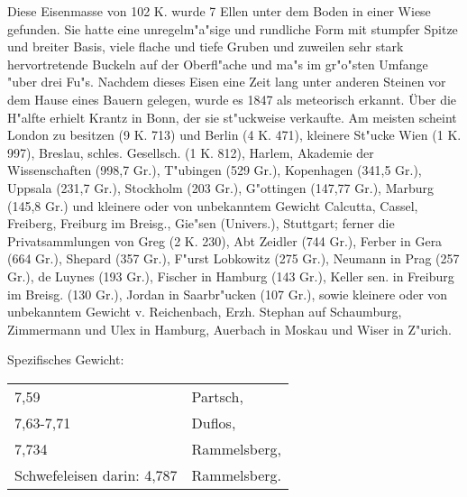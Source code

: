 \documentclass[a4paper, 11pt, oneside]{article}
\begin{document}
Diese Eisenmasse von 102 K. wurde 7 Ellen unter dem Boden in einer Wiese gefunden. Sie hatte eine unregelm"a"sige und rundliche Form mit stumpfer Spitze und breiter Basis, viele flache und tiefe Gruben und zuweilen sehr stark hervortretende Buckeln auf der Oberfl"ache und ma"s im gr"o"sten Umfange "uber drei Fu"s. Nachdem dieses Eisen eine Zeit lang unter anderen Steinen vor dem Hause eines Bauern gelegen, wurde es 1847 als meteorisch erkannt. Über die H"alfte erhielt Krantz in Bonn, der sie st"uckweise verkaufte. Am meisten scheint London zu besitzen (9 K. 713) und Berlin (4 K. 471), kleinere St"ucke Wien (1 K. 997), Breslau, schles. Gesellsch. (1 K. 812), Harlem, Akademie der Wissenschaften (998,7 Gr.), T"ubingen (529 Gr.), Kopenhagen (341,5 Gr.), Uppsala (231,7 Gr.), Stockholm (203 Gr.), G"ottingen (147,77 Gr.), Marburg (145,8 Gr.) und kleinere oder von unbekanntem Gewicht Calcutta, Cassel, Freiberg, Freiburg im Breisg., Gie"sen (Univers.), Stuttgart; ferner die Privatsammlungen von Greg (2 K. 230), Abt Zeidler (744 Gr.), Ferber in Gera (664 Gr.), Shepard (357 Gr.), F"urst Lobkowitz (275 Gr.), Neumann in Prag (257 Gr.), de Luynes (193 Gr.), Fischer in Hamburg (143 Gr.), Keller sen. in Freiburg im Breisg. (130 Gr.), Jordan in Saarbr"ucken (107 Gr.), sowie kleinere oder von unbekanntem Gewicht v. Reichenbach, Erzh. Stephan auf Schaumburg, Zimmermann und Ulex in Hamburg, Auerbach in Moskau und Wiser in Z"urich.

Spezifisches Gewicht:  
\begin{table}[!ht]
    \centering
    \begin{tabular}{l l}
        7,59 & Partsch,\\
        7,63-7,71 & Duflos,\\
        7,734 & Rammelsberg,\\
        Schwefeleisen darin: 4,787 & Rammelsberg.
    \end{tabular}
\end{table}
\end{document}
